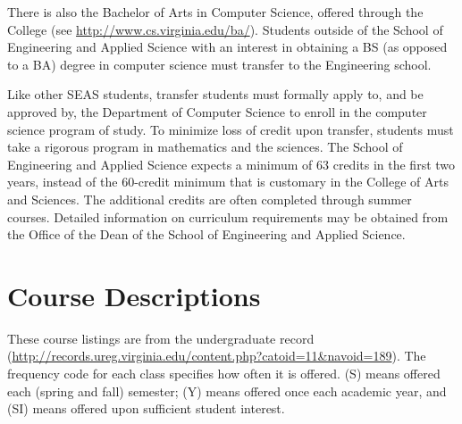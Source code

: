\documentclass[12pt,twoside]{article}
\newenvironment{itemlist}{
\begin{itemize}
\setlength{\itemsep}{0pt}
\setlength{\parskip}{0pt}}
{\end{itemize}}
\begin{document}
There is also the Bachelor of Arts in Computer Science, offered
through the College (see \url{http://www.cs.virginia.edu/ba/}).
Students outside of the School of Engineering and Applied Science with
an interest in obtaining a BS (as opposed to a BA) degree in computer
science must transfer to the Engineering school.

Like other SEAS students, transfer students must formally apply to,
and be approved by, the Department of Computer Science to enroll in
the computer science program of study. To minimize loss of credit upon
transfer, students must take a rigorous program in mathematics and the
sciences. The School of Engineering and Applied Science expects a
minimum of 63 credits in the first two years, instead of the 60-credit
minimum that is customary in the College of Arts and Sciences. The
additional credits are often completed through summer courses.
Detailed information on curriculum requirements may be obtained from
the Office of the Dean of the School of Engineering and Applied
Science.




\section{Course Descriptions}

\label{coursedescriptions}

These course listings are from the undergraduate record
(\url{http://records.ureg.virginia.edu/content.php?catoid=11&navoid=189}).
The frequency code for each class specifies how often it is offered.
(S) means offered each (spring and fall) semester; (Y) means offered
once each academic year, and (SI) means offered upon sufficient
student interest.

\end{document}
